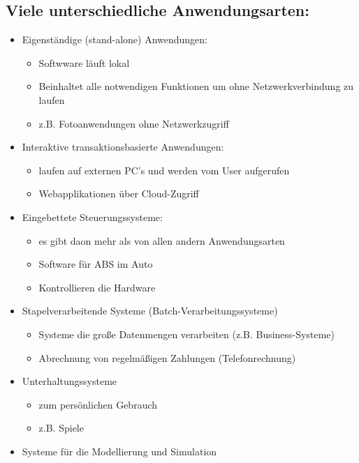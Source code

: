 \subsection{Viele unterschiedliche Anwendungsarten:}
\begin{itemize}
    \item Eigenständige (stand-alone) Anwendungen:
    \begin{itemize}
        \item Softwware läuft lokal
        \item Beinhaltet alle notwendigen Funktionen um ohne Netzwerkverbindung zu laufen
        \item z.B. Fotoanwendungen ohne Netzwerkzugriff
    \end{itemize}
    \item Interaktive transaktionsbasierte Anwendungen:
    \begin{itemize}
        \item laufen auf externen PC's und werden vom User aufgerufen
        \item Webapplikationen über Cloud-Zugriff
    \end{itemize}
    \item Eingebettete Steuerungssysteme:
    \begin{itemize}
        \item es gibt daon mehr als von allen andern Anwendungsarten
        \item Software für ABS im Auto
        \item Kontrollieren die Hardware
    \end{itemize}
    \item Stapelverarbeitende Systeme (Batch-Verarbeitungssysteme)
    \begin{itemize}
        \item Systeme die große Datenmengen verarbeiten (z.B. Business-Systeme)
        \item Abrechnung von regelmäßigen Zahlungen (Telefonrechnung)
    \end{itemize}
    \item Unterhaltungssysteme
    \begin{itemize}
        \item zum persönlichen Gebrauch
        \item z.B. Spiele
    \end{itemize}
    \item Systeme für die Modellierung und Simulation
    \begin{itemize}

\end{itemize}
\end{itemize}
